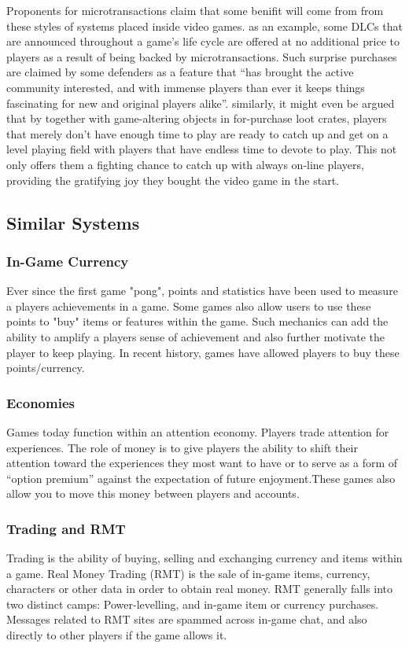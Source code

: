\documentclass{article}
\begin{document}
Proponents for microtransactions claim that some benifit will come from from these styles of systems placed inside video games. as an example, some DLCs that are announced throughout a game’s life cycle are offered at no additional price to players as a result of being backed by microtransactions. Such surprise purchases are claimed by some defenders as a feature that “has brought the active community interested, and with immense players than ever it keeps things fascinating for new and original players alike”. similarly, it might even be argued that by together with game-altering objects in for-purchase loot crates, players that merely don't have enough time to play are ready to catch up and get on a level playing field with players that have endless time to devote to play. This not only offers them a fighting chance to catch up with always on-line players, providing the gratifying joy they bought the video game in the start.
\cite{walker1992psychology}\cite{dowling2005electronic}

\subsection{Similar Systems}
\subsubsection{In-Game Currency}
Ever since the first game "pong", points and statistics have been used to measure a players achievements in a game. Some games also allow users to use these points to "buy" items or features within the game. Such mechanics can add the ability to amplify a players sense of achievement and also further motivate the player to keep playing.
In recent history, games have allowed players to buy these points/currency.

\subsubsection{Economies}
Games today function within an attention economy. Players trade attention for experiences. The role of money is to give players the ability to shift their attention toward the experiences they most want to have or to serve as a form of “option premium” against the expectation of future enjoyment.These games also allow you to move this money between players and accounts.

\subsubsection{Trading and RMT}
Trading is the ability of buying, selling and exchanging currency and items within a game. Real Money Trading (RMT) is the sale of in-game items, currency, characters or other data in order to obtain real money. RMT generally falls into two distinct camps: Power-levelling, and in-game item or currency purchases. Messages related to RMT sites are spammed across in-game chat, and also directly to other players if the game allows it.
\end{document}
